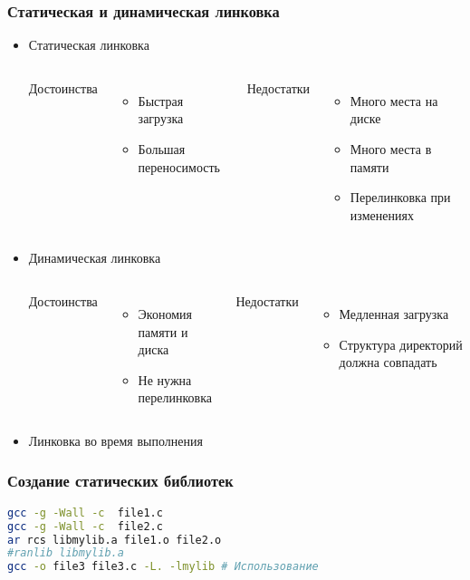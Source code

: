 \begin{frame}
 \frametitle{Статическая и динамическая линковка}
 \begin{itemize}
   \item Статическая линковка
     \begin{columns}
       \begin{center}
         Достоинства 
       \end{center}
       \begin{itemize}
         \item Быстрая загрузка
         \item Большая переносимость
       \end{itemize}
       \begin{center}
         Недостатки
       \end{center}
       \begin{itemize}
         \item Много места на диске
         \item Много места в памяти
         \item Перелинковка при изменениях
       \end{itemize}
     \end{columns}
   \item Динамическая линковка
     \begin{columns}
       \begin{center}
         Достоинства 
       \end{center}
       \begin{itemize}
         \item Экономия памяти и диска
         \item Не нужна перелинковка
       \end{itemize}
       \begin{center}
         Недостатки
       \end{center}
       \begin{itemize}
         \item Медленная загрузка
         \item Структура директорий должна совпадать
       \end{itemize}
        
     \end{columns}
    \item{Линковка во время выполнения}
 \end{itemize}
\end{frame}
\begin{frame}[fragile]
 \frametitle{Создание статических библиотек}
\begin{lstlisting}[language=sh]
gcc -g -Wall -c  file1.c
gcc -g -Wall -c  file2.c
ar rcs libmylib.a file1.o file2.o
#ranlib libmylib.a
gcc -o file3 file3.c -L. -lmylib # Использование
\end{lstlisting}
\end{frame}

